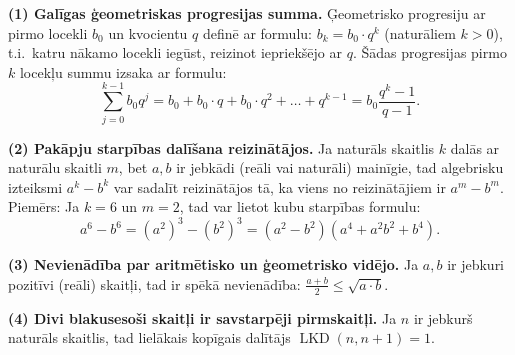 \documentclass[a4paper,12pt]{article}
\begin{document}
\newpage


{\bf (1) Galīgas ģeometriskas progresijas summa.} Ģeometrisko progresiju ar pirmo locekli $b_0$ 
un kvocientu $q$ definē ar formulu: $b_k = b_0 \cdot q^k$ (naturāliem $k>0$), t.i.\ katru nākamo locekli 
iegūst, reizinot iepriekšējo ar $q$. Šādas progresijas pirmo $k$ locekļu summu izsaka ar formulu:
$$\sum\limits_{j=0}^{k-1} b_0 q^j = b_0 + b_0 \cdot q + b_0 \cdot q^2 + \ldots + q^{k-1} = b_0 \frac{q^k-1}{q-1}.$$

{\bf (2) Pakāpju starpības dalīšana reizinātājos.} 
Ja naturāls skaitlis $k$ dalās ar naturālu skaitli $m$, bet $a,b$ ir jebkādi (reāli vai naturāli) mainīgie, 
tad algebrisku izteiksmi $a^k - b^k$ var sadalīt reizinātājos tā, ka viens no reizinātājiem ir $a^m - b^m$.\\
Piemērs: Ja $k = 6$ un $m=2$, tad var lietot kubu starpības formulu:
$$a^6 - b^6 = (a^2)^3 - (b^2)^3 = \left(a^2 - b^2\right)\left(a^4 + a^2b^2 + b^4\right).$$

{\bf (3) Nevienādība par aritmētisko un ģeometrisko vidējo.}
Ja $a,b$ ir jebkuri pozitīvi (reāli) skaitļi, tad ir spēkā nevienādība:
${\displaystyle \frac{a+b}{2} \leq \sqrt{a \cdot b}}$.

{\bf (4) Divi blakusesoši skaitļi ir savstarpēji pirmskaitļi.}
Ja $n$ ir jebkurš naturāls skaitlis, tad lielākais kopīgais dalītājs $\operatorname{LKD}(n,n+1) = 1$.
\end{document}
